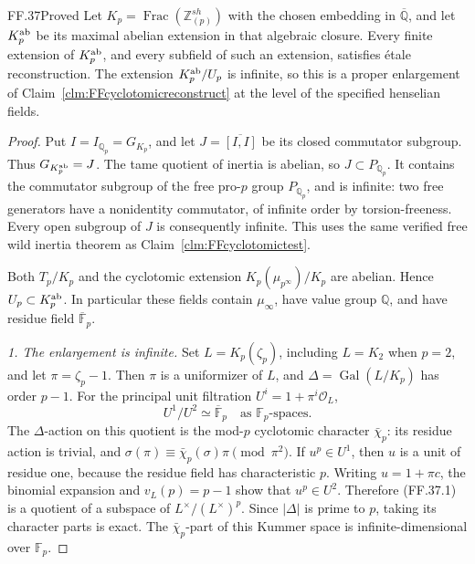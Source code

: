 \begin{claim}{FF.37}{Proved}\label{clm:FFmaxabelianreconstruct}
Let \(K_p=\operatorname{Frac}(\mathbb Z_{(p)}^{sh})\)
with the chosen embedding in \(\overline{\mathbb Q}\),
and let \(K_p^{\rm ab}\) be its maximal
abelian extension in that algebraic closure.
Every finite extension of \(K_p^{\rm ab}\),
and every subfield of such an extension,
satisfies \'etale reconstruction.
The extension \(K_p^{\rm ab}/U_p\) is infinite,
so this is a proper enlargement of
Claim~\ref{clm:FFcyclotomicreconstruct} at the
level of the specified henselian fields.
\end{claim}
\begin{proof}
Put \(I=I_{\mathbb Q_p}=G_{K_p}\), and
let \(J=\overline{[I,I]}\) be its closed
commutator subgroup. Thus
\(G_{K_p^{\rm ab}}=J\).
The tame quotient of inertia is abelian,
so \(J\subset P_{\mathbb Q_p}\).
It contains the commutator subgroup of
the free pro-\(p\) group
\(P_{\mathbb Q_p}\), and is infinite:
two free generators have a nonidentity
commutator, of infinite order by
torsion-freeness. Every open subgroup
of \(J\) is consequently infinite.
This uses the same verified free wild
inertia theorem as Claim~\ref{clm:FFcyclotomictest}.

Both \(T_p/K_p\) and the cyclotomic
extension \(K_p(\mu_{p^\infty})/K_p\)
are abelian. Hence \(U_p\subset K_p^{\rm ab}\).
In particular these fields contain
\(\mu_\infty\), have value group
\(\mathbb Q\), and have residue field
\(\overline{\mathbb F}_p\).

\emph{1. The enlargement is infinite.}
Set \(L=K_p(\zeta_p)\), including
\(L=K_2\) when \(p=2\), and let
\(\pi=\zeta_p-1\). Then \(\pi\) is
a uniformizer of \(L\), and
\(\Delta=\operatorname{Gal}(L/K_p)\)
has order \(p-1\). For the principal
unit filtration \(U^i=1+\pi^i\mathcal O_L\),
\[
                    U^1/U^2\simeq
                 \overline{\mathbb F}_p
                \quad\text{as }\mathbb F_p\text{-spaces}.
                                                        \tag{FF.37.1}
\]
The \(\Delta\)-action on this quotient
is the mod-\(p\) cyclotomic character
\(\bar\chi_p\): its residue action is
trivial, and
\(\sigma(\pi)\equiv\bar\chi_p(\sigma)\pi
\pmod{\pi^2}\).
If \(u^p\in U^1\), then \(u\) is a
unit of residue one, because the residue
field has characteristic \(p\). Writing
\(u=1+\pi c\), the binomial expansion
and \(v_L(p)=p-1\) show that
\(u^p\in U^2\). Therefore (FF.37.1)
is a quotient of a subspace of
\(L^\times/(L^\times)^p\).
Since \(|\Delta|\) is prime to \(p\),
taking its character parts is exact.
The \(\bar\chi_p\)-part of this Kummer
space is infinite-dimensional over
\(\mathbb F_p\).


\end{proof}
